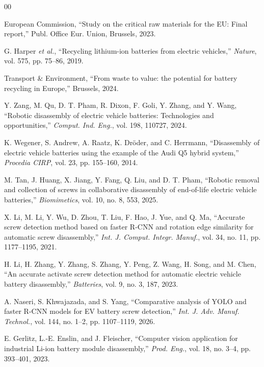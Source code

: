 \documentclass[conference]{IEEEtran}
\begin{document}
\begin{thebibliography}{00}

 European Commission, ``Study on the critical raw materials for
the EU: Final report,'' Publ. Office Eur. Union, Brussels, 2023.

 G. Harper \emph{et al.}, ``Recycling lithium-ion batteries
from electric vehicles,'' \emph{Nature}, vol. 575, pp. 75--86, 2019.

 Transport \& Environment, ``From waste to value: the potential
for battery recycling in Europe,'' Brussels, 2024.

 Y. Zang, M. Qu, D. T. Pham, R. Dixon, F. Goli,
Y. Zhang, and Y. Wang, ``Robotic disassembly of electric vehicle batteries:
Technologies and opportunities,'' \emph{Comput. Ind. Eng.}, vol. 198, 110727,
2024.

 K. Wegener, S. Andrew, A. Raatz, K. Dr\"oder, and
C. Herrmann, ``Disassembly of electric vehicle batteries using the example of the
Audi Q5 hybrid system,'' \emph{Procedia CIRP}, vol. 23, pp. 155--160, 2014.

 M. Tan, J. Huang, X. Jiang, Y. Fang, Q. Liu, and
D. T. Pham, ``Robotic removal and collection of screws in collaborative
disassembly of end-of-life electric vehicle batteries,'' \emph{Biomimetics},
vol. 10, no. 8, 553, 2025.

 X. Li, M. Li, Y. Wu, D. Zhou, T. Liu, F. Hao, J. Yue,
and Q. Ma, ``Accurate screw detection method based on faster R-CNN and rotation
edge similarity for automatic screw disassembly,'' \emph{Int. J. Comput. Integr.
Manuf.}, vol. 34, no. 11, pp. 1177--1195, 2021.

 H. Li, H. Zhang, Y. Zhang, S. Zhang, Y. Peng, Z. Wang,
H. Song, and M. Chen, ``An accurate activate screw detection method for automatic
electric vehicle battery disassembly,'' \emph{Batteries}, vol. 9, no. 3, 187, 2023.

 A. Naseri, S. Khwajazada, and S. Yang, ``Comparative
analysis of YOLO and faster R-CNN models for EV battery screw detection,''
\emph{Int. J. Adv. Manuf. Technol.}, vol. 144, no. 1--2, pp. 1107--1119, 2026.

 E. Gerlitz, L.-E. Enslin, and J. Fleischer, ``Computer
vision application for industrial Li-ion battery module disassembly,''
\emph{Prod. Eng.}, vol. 18, no. 3--4, pp. 393--401, 2023.


\end{thebibliography}
\end{document}
